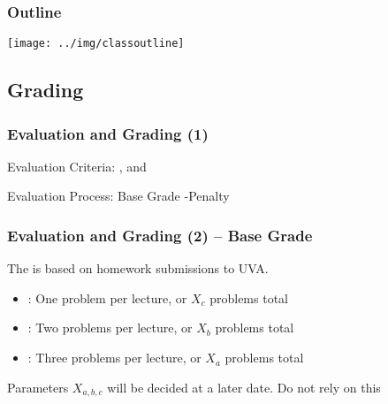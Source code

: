 \documentclass{beamer}
\begin{document}
\begin{frame}
  \frametitle{Outline}
  \begin{center}
    \texttt{[image: ../img/classoutline]}
  \end{center}
\end{frame}

\subsection{Grading}

\begin{frame}
  \frametitle{Evaluation and Grading (1)}

  Evaluation Criteria: , 
  and 
  
  \bigskip

  Evaluation Process: Base Grade  \alert{-Penalty}
\end{frame}

\begin{frame}
  \frametitle{Evaluation and Grading (2) -- Base Grade}

  The  is based on homework submissions to UVA.

  \bigskip
  
  \begin{itemize}
  \item {}: One problem per lecture, or $X_c$ problems total

    \medskip

  \item {}: Two problems per lecture, or $X_b$ problems total

    \medskip

  \item {}: Three problems per lecture, or $X_a$ problems total
  \end{itemize}

  \vfill

  {\small
  Parameters $X_{a,b,c}$ will be decided at a later date. \alert{Do not rely on this}}

\end{frame}
\end{document}
